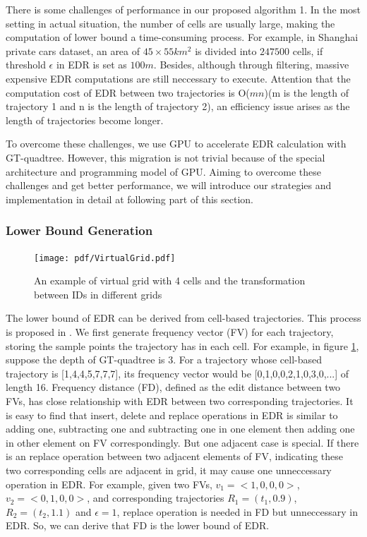 \documentclass[conference]{IEEEtran}
\begin{document}
There is some challenges of performance in our proposed algorithm 1. In the most setting in actual situation, the number of cells are usually large, making the computation of lower bound a time-consuming process. For example, in Shanghai private cars dataset, an area of $45\times 55 km^{2}$ is divided into $247500$ cells, if threshold $\epsilon$ in EDR is set as $100m$. Besides, although through filtering, massive expensive EDR computations are still neccessary to execute. Attention that the computation cost of EDR between two trajectories is O($mn$)(m is the length of trajectory 1 and n is the length of trajectory 2), an efficiency issue arises as the length of trajectories become longer. 

To overcome these challenges, we use GPU to accelerate EDR calculation with GT-quadtree. However, this migration is not trivial because of the special architecture and programming model of GPU. Aiming to overcome these challenges and get better performance, we will introduce our strategies and implementation in detail at following part of this section.

\subsubsection{Lower Bound Generation}
\begin{figure}[!t]\centering
	\texttt{[image: pdf/VirtualGrid.pdf]}
	\caption{An example of virtual grid with 4 cells and the transformation between IDs in different grids\label{fig:VirtualGrid}}
\end{figure}

The lower bound of EDR can be derived from cell-based trajectories. This process is proposed in \cite{DBLP:conf/sigmod/ChenOO05}. We first generate frequency vector (FV) for each trajectory, storing the sample points the trajectory has in each cell. For example, in figure \ref{fig:VirtualGrid}, suppose the depth of GT-quadtree is 3. For a trajectory whose cell-based trajectory is [1,4,4,5,7,7,7], its frequency vector would be [0,1,0,0,2,1,0,3,0,...] of length 16. Frequency distance (FD), defined as the edit distance between two FVs, has close relationship with EDR between two corresponding trajectories. It is easy to find that insert, delete and replace operations in EDR is similar to adding one, subtracting one and subtracting one in one element then adding one in other element on FV correspondingly. But one adjacent case is special. If there is an replace operation between two adjacent elements of FV, indicating these two corresponding cells are adjacent in grid, it may cause one unneccessary operation in EDR. For example, given two FVs, $v_{1}=<1,0,0,0>$, $v_{2}=<0,1,0,0>$, and corresponding trajectories $R_{1}=(t_{1},0.9)$, $R_{2}=(t_{2},1.1)$ and $\epsilon =1$, replace operation is needed in FD but unneccessary in EDR. So, we can derive that FD is the lower bound of EDR.
\end{document}
